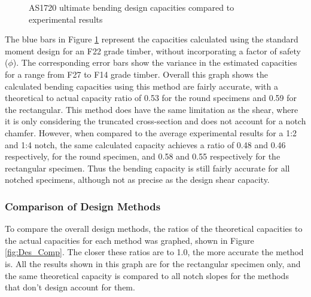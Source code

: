 \documentclass[11pt,a4paper]{article}
\numberwithin{equation}{subsection}
\begin{document}
\vspace*{\baselineskip}

\begin{figure}[h]
	\begin{center}
	\end{center}
	\caption{AS1720 ultimate bending design capacities compared to experimental results}
	\label{fig:Bend_Des}
\end{figure}

\noindent
The blue bars in Figure \ref{fig:Bend_Des} represent the capacities calculated using the standard moment design for an F22 grade timber, without incorporating a factor of safety ($\phi$). The corresponding error bars show the variance in the estimated capacities for a range from F27 to F14 grade timber. Overall this graph shows the calculated bending capacities using this method are fairly accurate, with a theoretical to actual capacity ratio of 0.53 for the round specimens and 0.59 for the rectangular. This method does have the same limitation as the shear, where it is only considering the truncated cross-section and does not account for a notch chamfer. However, when compared to the average experimental results for a 1:2 and 1:4 notch, the same calculated capacity achieves a ratio of 0.48 and 0.46 respectively, for the round specimen, and 0.58 and 0.55 respectively for the rectangular specimen. Thus the bending capacity is still fairly accurate for all notched specimens, although not as precise as the design shear capacity. 

\subsubsection{Comparison of Design Methods}
To compare the overall design methods, the ratios of the theoretical capacities to the actual capacities for each method was graphed, shown in Figure \ref{fig:Des_Comp}. The closer these ratios are to 1.0, the more accurate the method is. All the results shown in this graph are for the rectangular specimen only, and the same theoretical capacity is compared to all notch slopes for the methods that don't design account for them. 
\end{document}
